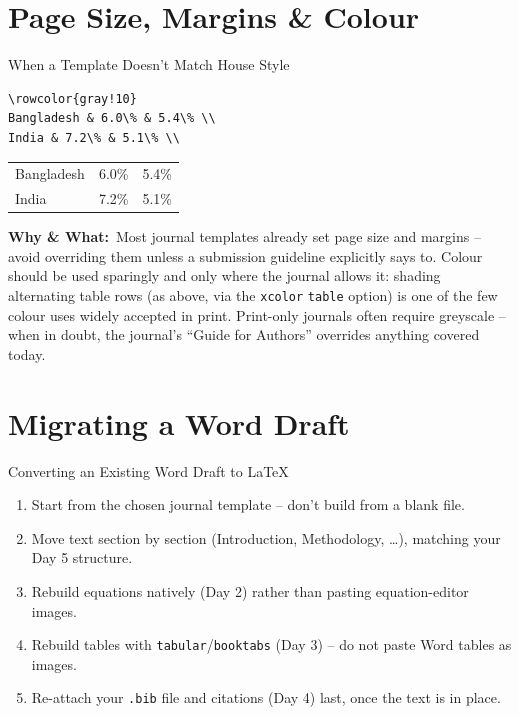 \documentclass[11pt,aspectratio=169,table]{beamer}
\newcommand{\whybox}[1]{%
  \vspace{2pt}
  {\scriptsize\raggedright\textcolor{red!55!black}{\textbf{Why \& What:}}~#1\par}
}
\begin{document}
\section{Page Size, Margins \& Colour}

\begin{frame}[fragile]{When a Template Doesn't Match House Style}
  \begin{lstlisting}
\rowcolor{gray!10}
Bangladesh & 6.0\% & 5.4\% \\
India & 7.2\% & 5.1\% \\
  \end{lstlisting}
  \begin{outputbox}
    \small
    \begin{tabular}{lcc}
      Bangladesh & 6.0\% & 5.4\% \\
      India & 7.2\% & 5.1\% \\
    \end{tabular}
  \end{outputbox}
  \whybox{Most journal templates already set page size and margins --
  avoid overriding them unless a submission guideline explicitly says
  to. Colour should be used sparingly and only where the journal
  allows it: shading alternating table rows (as above, via the
  \texttt{xcolor} \texttt{table} option) is one of the few colour uses
  widely accepted in print. Print-only journals often require
  greyscale -- when in doubt, the journal's ``Guide for Authors''
  overrides anything covered today.}
\end{frame}

\section{Migrating a Word Draft}

\begin{frame}{Converting an Existing Word Draft to LaTeX}
  \small
  \begin{enumerate}
    \item Start from the chosen journal template -- don't build from a blank file.
    \item Move text section by section (Introduction, Methodology, \dots), matching your Day 5 structure.
    \item Rebuild equations natively (Day 2) rather than pasting equation-editor images.
    \item Rebuild tables with \texttt{tabular}/\texttt{booktabs} (Day 3) -- do not paste Word tables as images.
    \item Re-attach your \texttt{.bib} file and citations (Day 4) last, once the text is in place.
  \end{enumerate}
\end{frame}
\end{document}

